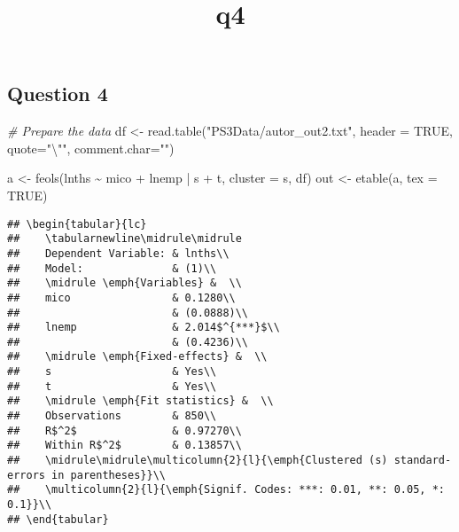 \documentclass[
]{article}
\title{q4}
\author{}
\date{\vspace{-2.5em}}
\newenvironment{Shaded}{\begin{snugshade}}{\end{snugshade}}
\newcommand{\AttributeTok}[1]{\textcolor[rgb]{0.77,0.63,0.00}{#1}}
\newcommand{\CommentTok}[1]{\textcolor[rgb]{0.56,0.35,0.01}{\textit{#1}}}
\newcommand{\ConstantTok}[1]{\textcolor[rgb]{0.00,0.00,0.00}{#1}}
\newcommand{\FunctionTok}[1]{\textcolor[rgb]{0.00,0.00,0.00}{#1}}
\newcommand{\NormalTok}[1]{#1}
\newcommand{\OtherTok}[1]{\textcolor[rgb]{0.56,0.35,0.01}{#1}}
\newcommand{\SpecialCharTok}[1]{\textcolor[rgb]{0.00,0.00,0.00}{#1}}
\newcommand{\StringTok}[1]{\textcolor[rgb]{0.31,0.60,0.02}{#1}}
\begin{document}
\maketitle

\newpage

\hypertarget{question-4}{%
\subsection{Question 4}\label{question-4}}

\begin{Shaded}
\begin{Highlighting}[]
\CommentTok{\# Prepare the data}
\NormalTok{df }\OtherTok{\textless{}{-}} \FunctionTok{read.table}\NormalTok{(}\StringTok{"PS3Data/autor\_out2.txt"}\NormalTok{, }\AttributeTok{header =} \ConstantTok{TRUE}\NormalTok{, }
                 \AttributeTok{quote=}\StringTok{"}\SpecialCharTok{\textbackslash{}"}\StringTok{"}\NormalTok{, }\AttributeTok{comment.char=}\StringTok{""}\NormalTok{)}

\NormalTok{a }\OtherTok{\textless{}{-}} \FunctionTok{feols}\NormalTok{(lnths }\SpecialCharTok{\textasciitilde{}}\NormalTok{ mico }\SpecialCharTok{+}\NormalTok{ lnemp }\SpecialCharTok{|}\NormalTok{ s }\SpecialCharTok{+}\NormalTok{ t, }\AttributeTok{cluster =} \StringTok{\textquotesingle{}s\textquotesingle{}}\NormalTok{, df)}
\NormalTok{out }\OtherTok{\textless{}{-}} \FunctionTok{etable}\NormalTok{(a, }\AttributeTok{tex =} \ConstantTok{TRUE}\NormalTok{) }
\end{Highlighting}
\end{Shaded}

\begin{verbatim}
## \begin{tabular}{lc}
##    \tabularnewline\midrule\midrule
##    Dependent Variable: & lnths\\
##    Model:              & (1)\\
##    \midrule \emph{Variables} &  \\
##    mico                & 0.1280\\
##                        & (0.0888)\\
##    lnemp               & 2.014$^{***}$\\
##                        & (0.4236)\\
##    \midrule \emph{Fixed-effects} &  \\
##    s                   & Yes\\
##    t                   & Yes\\
##    \midrule \emph{Fit statistics} &  \\
##    Observations        & 850\\
##    R$^2$               & 0.97270\\
##    Within R$^2$        & 0.13857\\
##    \midrule\midrule\multicolumn{2}{l}{\emph{Clustered (s) standard-errors in parentheses}}\\
##    \multicolumn{2}{l}{\emph{Signif. Codes: ***: 0.01, **: 0.05, *: 0.1}}\\
## \end{tabular}
\end{verbatim}
\end{document}
